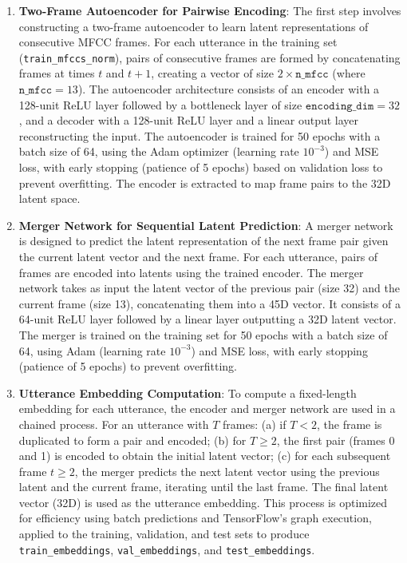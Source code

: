 \documentclass[12pt]{article}
\begin{document}
\begin{enumerate}
    \item \textbf{Two-Frame Autoencoder for Pairwise Encoding}: The first step involves constructing a two-frame autoencoder to learn latent representations of consecutive MFCC frames. For each utterance in the training set (\texttt{train\_mfccs\_norm}), pairs of consecutive frames are formed by concatenating frames at times $t$ and $t+1$, creating a vector of size $2 \times \texttt{n\_mfcc}$ (where $\texttt{n\_mfcc} = 13$). The autoencoder architecture consists of an encoder with a 128-unit ReLU layer followed by a bottleneck layer of size $\texttt{encoding\_dim} = 32$, and a decoder with a 128-unit ReLU layer and a linear output layer reconstructing the input. The autoencoder is trained for 50 epochs with a batch size of 64, using the Adam optimizer (learning rate $10^{-3}$) and MSE loss, with early stopping (patience of 5 epochs) based on validation loss to prevent overfitting. The encoder is extracted to map frame pairs to the 32D latent space.

    \item \textbf{Merger Network for Sequential Latent Prediction}: A merger network is designed to predict the latent representation of the next frame pair given the current latent vector and the next frame. For each utterance, pairs of frames are encoded into latents using the trained encoder. The merger network takes as input the latent vector of the previous pair (size 32) and the current frame (size 13), concatenating them into a 45D vector. It consists of a 64-unit ReLU layer followed by a linear layer outputting a 32D latent vector. The merger is trained on the training set for 50 epochs with a batch size of 64, using Adam (learning rate $10^{-3}$) and MSE loss, with early stopping (patience of 5 epochs) to prevent overfitting.

    \item \textbf{Utterance Embedding Computation}: To compute a fixed-length embedding for each utterance, the encoder and merger network are used in a chained process. For an utterance with $T$ frames: (a) if $T < 2$, the frame is duplicated to form a pair and encoded; (b) for $T \geq 2$, the first pair (frames 0 and 1) is encoded to obtain the initial latent vector; (c) for each subsequent frame $t \geq 2$, the merger predicts the next latent vector using the previous latent and the current frame, iterating until the last frame. The final latent vector (32D) is used as the utterance embedding. This process is optimized for efficiency using batch predictions and TensorFlow's graph execution, applied to the training, validation, and test sets to produce \texttt{train\_embeddings}, \texttt{val\_embeddings}, and \texttt{test\_embeddings}.


\end{enumerate}
\end{document}

